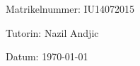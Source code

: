\begin{large} 
\begin{center}
Matrikelnummer: IU14072015
\end{center}
\end{large} 

\vspace*{-6mm}

\begin{large} 
\begin{center}
Tutorin: Nazil Andjic
\end{center}
\end{large} 

\vspace*{-6mm}

\begin{large} 
\begin{center}
Datum: \today
\end{center}
\end{large} 


\pagestyle{empty} %

